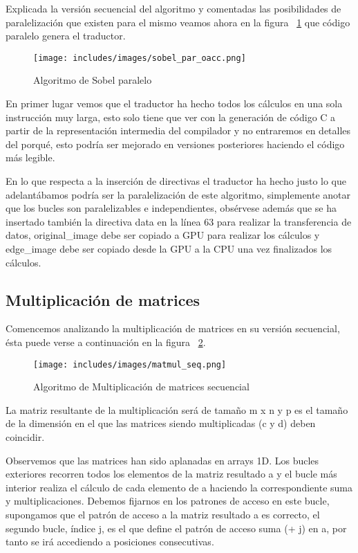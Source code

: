 Explicada la versión secuencial del algoritmo y comentadas las posibilidades de paralelización que existen para el mismo veamos ahora en la figura ~\ref{fig:Sobelpar} que código paralelo genera el traductor.

\begin{figure}[t]
\centering
\texttt{[image: includes/images/sobel\_par\_oacc.png]}
\caption{Algoritmo de Sobel paralelo}
\label{fig:Sobelpar}
\end{figure}

En primer lugar vemos que el traductor ha hecho todos los cálculos en una sola instrucción muy larga, esto solo tiene que ver con la generación de código C a partir de la representación intermedia del compilador y no entraremos en detalles del porqué, esto podría ser mejorado en versiones posteriores haciendo el código más legible.

En lo que respecta a la inserción de directivas el traductor ha hecho justo lo que adelantábamos podría ser la paralelización de este algoritmo, simplemente anotar que los bucles son paralelizables e independientes, obsérvese además que se ha insertado también la directiva data en la línea 63 para realizar la transferencia de datos, original\_image debe ser copiado a GPU para realizar los cálculos y edge\_image debe ser copiado desde la GPU a la CPU una vez finalizados los cálculos.



\subsection{Multiplicación de matrices}

Comencemos analizando la multiplicación de matrices en su versión secuencial, ésta puede verse a continuación en la figura ~\ref{fig:Matmulseq}.

\begin{figure}[t]
\centering
\texttt{[image: includes/images/matmul\_seq.png]}
\caption{Algoritmo de Multiplicación de matrices secuencial}
\label{fig:Matmulseq}
\end{figure}

La matriz resultante de la multiplicación será de tamaño m x n y p es el tamaño de la dimensión en el que las matrices siendo multiplicadas (c y d) deben coincidir.

Observemos que las matrices han sido aplanadas en arrays 1D. Los bucles exteriores recorren todos los elementos de la matriz resultado a y el bucle más interior realiza el cálculo de cada elemento de a haciendo la correspondiente suma y multiplicaciones. Debemos fijarnos en los patrones de acceso en este bucle, supongamos que el patrón de acceso a la matriz resultado a es correcto, el segundo bucle, índice j, es el que define el patrón de acceso suma (+ j) en a, por tanto se irá accediendo a posiciones consecutivas.

